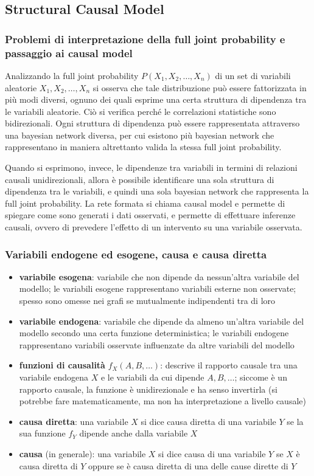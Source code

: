 \subsection{Structural Causal Model}
\subsubsection*{Problemi di interpretazione della full joint probability e passaggio ai causal model}
Analizzando la full joint probability \(P(X_1, X_2, \ldots, X_n)\) di un set di variabili aleatorie \(X_1, X_2, \ldots, X_n\)
si osserva che tale distribuzione può essere fattorizzata in più modi diversi, ognuno dei quali esprime una certa struttura
di dipendenza tra le variabili aleatorie. Ciò si verifica perché le correlazioni statistiche sono bidirezionali. Ogni struttura
di dipendenza può essere rappresentata attraverso una bayesian network diversa, per cui esistono più bayesian network che
rappresentano in maniera altrettanto valida la stessa full joint probability.

Quando si esprimono, invece, le dipendenze tra variabili in termini di relazioni causali unidirezionali, allora è possibile
identificare una sola struttura di dipendenza tra le variabili, e quindi una sola bayesian network che rappresenta la full joint
probability. La rete formata si chiama causal model e permette di spiegare come sono generati i dati osservati, e permette di
effettuare inferenze causali, ovvero di prevedere l'effetto di un intervento su una variabile osservata.

\subsubsection*{Variabili endogene ed esogene, causa e causa diretta}
\begin{itemize}
	\item \textbf{variabile esogena}: variabile che non dipende da nessun'altra variabile del modello; le variabili esogene
	rappresentano variabili esterne non osservate; spesso sono omesse nei grafi se mutualmente indipendenti tra di loro
	\item \textbf{variabile endogena}: variabile che dipende da almeno un'altra variabile del modello secondo una certa funzione
	deterministica; le variabili endogene rappresentano variabili osservate influenzate da altre variabili del modello
	\item \textbf{funzioni di causalità} \(f_X(A,B,\dots)\): descrive il rapporto causale tra una variabile endogena \(X\)
	e le variabili da cui dipende \(A, B, \dots\); siccome è un rapporto causale, la funzione è unidirezionale e ha senso
	invertirla (si potrebbe fare matematicamente, ma non ha interpretazione a livello causale)
	\item \textbf{causa diretta}: una variabile \(X\) si dice causa diretta di una variabile \(Y\) se la sua funzione \(f_Y\)
	dipende anche dalla variabile \(X\)
	\item \textbf{causa} (in generale): una variabile \(X\) si dice causa di una variabile \(Y\) se \(X\) è causa diretta
	di \(Y\) oppure se è causa diretta di una delle cause dirette di \(Y\)
\end{itemize}

